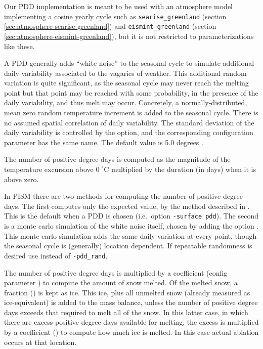 \documentclass[titlepage,letterpaper,final]{scrartcl}
\begin{document}
Our PDD implementation is meant to be used with an atmosphere model
implementing a cosine yearly cycle such as \texttt{searise_greenland} (section
\ref{sec:atmosphere-searise-greenland}) and \texttt{eismint_greenland} (section
\ref{sec:atmosphere-eismint-greenland}), but it is not restricted to
parameterizations like these.

A PDD generally adds ``white noise'' to the seasonal cycle to simulate
additional daily variability associated to the vagaries of weather. This
additional random variation is quite significant, as the seasonal cycle may
never reach the melting point but that point may be reached with some
probability, in the presence of the daily variability, and thus melt may occur.
Concretely, a normally-distributed, mean zero random temperature increment is
added to the seasonal cycle. There is no assumed spatial correlation of daily
variability. The standard deviation of the daily variability is controlled by
the  option, and the corresponding configuration
parameter has the same name. The default value is 5.0 degrees
\cite{RitzEISMINT}.

The number of positive degree days is computed as the magnitude of the
temperature excursion above $0\!\phantom{|}^\circ \text{C}$ multiplied by the
duration (in days) when it is above zero.

In PISM there are two methods for computing the number of positive degree days.
The first computes only the expected value, by the method described in
\cite{CalovGreve05}. This is the default when a PDD is chosen (i.e.~option
\texttt{-surface~pdd}). The second is a monte carlo simulation of the white
noise itself, chosen by adding the option . This monte
carlo simulation adds the same daily variation at every point, though the
seasonal cycle is (generally) location dependent. If repeatable randomness is
desired use  instead of \texttt{-pdd_rand}.

The number of positive degree days is multiplied by a coefficient (config
parameter ) to compute the amount of snow melted. Of
the melted snow, a fraction () is kept as ice. This ice,
plus all unmelted snow (already measured as ice-equivalent) is added to the
mass balance, unless the number of positive degree days exceeds that required
to melt all of the snow. In this latter case, in which there are excess
positive degree days available for melting, the excess is multiplied by a
coefficient () to compute how much ice is melted. In
this case actual ablation occurs at that location.
\end{document}
